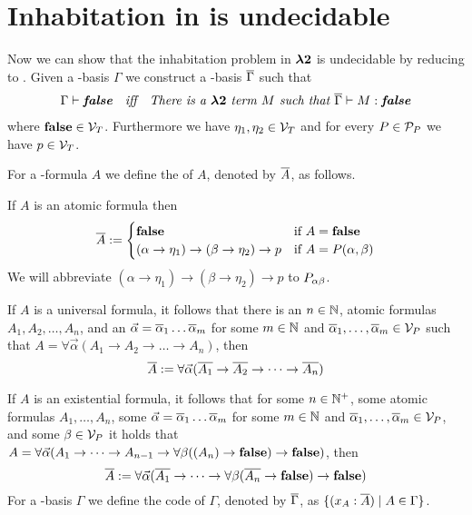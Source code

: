 \section{Inhabitation in \lambdaTwo{} is undecidable}\label{sec.4}
Now we can show that the inhabitation problem in $\boldsymbol{\lambda2}$ %
is undecidable by reducing \PCons{} to \lambdaInhab{}. Given a \SysP-basis $\Gamma$ we construct a \lambdaTwo-basis $\overline{\Gamma}$ such that 
\begin{align*}
\textit{$\Gamma\vdash\textbf{false}$}&&\textit{iff}&&\textit{There is a $\boldsymbol{\lambda2}$ term $M$ such that  $\overline{\Gamma}\vdash M:\textbf{false}$}
\end{align*}
where $\textbf{false}\in\mathcal{V}_T$. Furthermore we have $\eta_1,\eta_2\in\mathcal{V}_T$ and for every $P\in\mathcal{P}_P$ we have $p\in\mathcal{V}_T$. 

\begin{definition}\label{def.4.1}
For a \SysP-formula $A$ we define the  of $A$, denoted by $\overline{A}$, as follows.

If $A$ is an atomic formula then
\[
\overline{A}:=
\begin{cases}
\textbf{false} &\text{if $A=\textbf{false}$}\\
(\alpha\to \eta_1)\to(\beta\to \eta_2)\to p &\text{if $A=P(\alpha,\beta)$} 
\end{cases}
\]
We will abbreviate $(\alpha\to \eta_1)\to(\beta\to \eta_2)\to p$ to $P_{\alpha\beta}$.

If $A$ is a universal formula, it follows that there is an $n\in\mathbb{N}$, atomic formulas $A_1,A_2,\dots,A_n$, and an $\predVec=\predVec[1]\dots\predVec[m]$ for some $m\in\mathbb{N}$ and $\predVec[1],\dots,\predVec[m]\in\VarP$ such that $A=\forall\vec{\alpha}(A_1\to A_2 \to\dots\to A_n)$, then 
\[\trans{A}:=\forall\predVec(\trans{A_1}\to \trans{A_2} \to\dots\to\trans{ A_n})\]

If $A$ is an existential formula, it follows that for some $n\in\mathbb{N}^+$, some atomic formulas $A_1,\dots,A_n$, some $\predVec=\predVec[1]\dots\predVec[m]$ for some $m\in\mathbb{N}$ and $\predVec[1],\dots,\predVec[m]\in\VarP$, and some $\beta\in\mathcal{V}_P$ it holds that $A=\forall\vec{\alpha}(A_1 \to\dots\to A_{n-1}\to \forall\beta((A_n)\to\textbf{false})\to\textbf{false})$, then
\[\trans{A}:=\forall\predVec(\trans{A_1}\to\dots\to\forall\beta(\trans{ A_n}\to\false)\to\false)\]
For a \SysP-basis $\Gamma$ we define the code of $\Gamma$, denoted by $\overline{\Gamma}$, as $\{(x_A:\overline{A})\mid A\in\Gamma\}$.
\end{definition}

